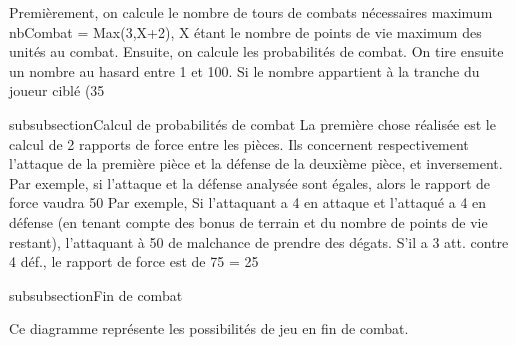 Premièrement, on calcule le nombre de tours de combats nécessaires maximum nbCombat = Max(3,X+2), X étant le nombre de points de vie maximum des unités au combat. Ensuite, on calcule les probabilités de combat. On tire ensuite un nombre au hasard entre 1 et 100. Si le nombre appartient à la tranche du joueur ciblé (35 %

subsubsection{Calcul de probabilités de combat}
La première chose réalisée est le calcul de 2 rapports de force entre les pièces. Ils concernent respectivement l'attaque de la première pièce et la défense de la deuxième pièce, et inversement. Par exemple, si l'attaque et la défense analysée sont égales, alors le rapport de force vaudra 50%
Par exemple, Si l’attaquant a 4 en attaque et l’attaqué a 4 en défense
(en tenant compte des bonus de terrain et du nombre de points de vie restant), l’attaquant à 50%
de malchance de prendre des dégats. S’il a 3 att. contre 4 déf., le rapport de force est de 75%
= 25%

subsubsection{Fin de combat}

Ce diagramme représente les possibilités de jeu en fin de combat. 

